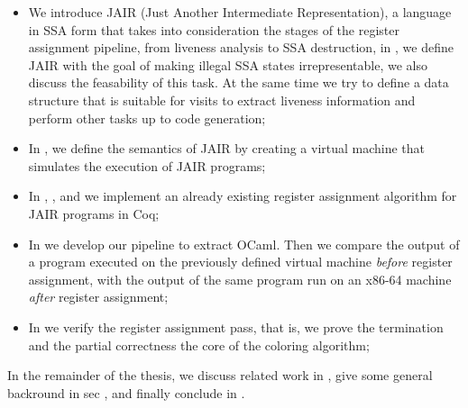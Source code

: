 \begin{itemize}
    \item We introduce JAIR (Just Another Intermediate Representation), a language in SSA form that takes into consideration the stages of the register assignment pipeline, from liveness analysis to SSA destruction, in , we define JAIR with the goal of making illegal SSA states irrepresentable, we also discuss the feasability of this task. At the same time we try to define a data structure that is suitable for visits to extract liveness information and perform other tasks up to code generation;

    \item In , we define the semantics of JAIR by creating a virtual machine that simulates the execution of JAIR programs;

    \item In , , and  we implement an already existing register assignment algorithm for JAIR programs in Coq;

    \item In  we develop our pipeline to extract OCaml. Then we compare the output of a program executed on the previously defined virtual machine \textit{before} register assignment, with the output of the same program run on an x86-64 machine \textit{after} register assignment;

    \item In  we verify the register assignment pass, that is, we prove the termination and the {\color{red} partial correctness} the core of the coloring algorithm;
\end{itemize}

In the remainder of the thesis, we discuss related work in , give some general backround in sec , and finally conclude in .

